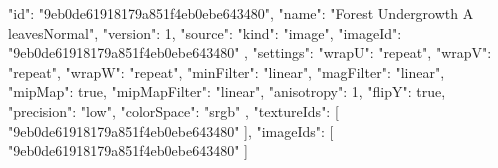 {
  "id": "9eb0de61918179a851f4eb0ebe643480",
  "name": "Forest Undergrowth A leavesNormal",
  "version": 1,
  "source": {
    "kind": "image",
    "imageId": "9eb0de61918179a851f4eb0ebe643480"
  },
  "settings": {
    "wrapU": "repeat",
    "wrapV": "repeat",
    "wrapW": "repeat",
    "minFilter": "linear",
    "magFilter": "linear",
    "mipMap": true,
    "mipMapFilter": "linear",
    "anisotropy": 1,
    "flipY": true,
    "precision": "low",
    "colorSpace": "srgb"
  },
  "textureIds": [
    "9eb0de61918179a851f4eb0ebe643480"
  ],
  "imageIds": [
    "9eb0de61918179a851f4eb0ebe643480"
  ]
}
